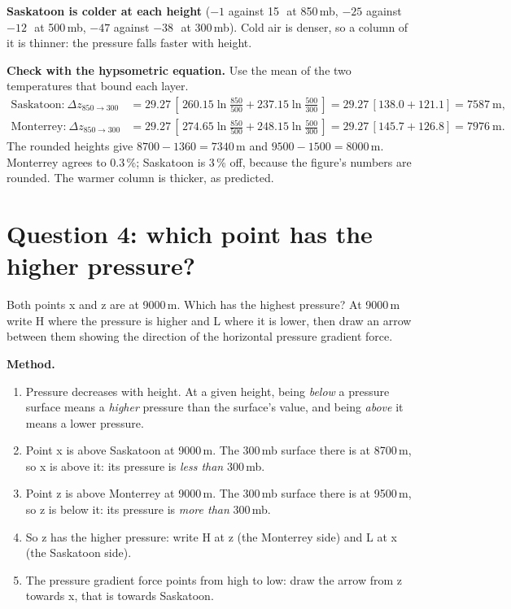 \begin{answerbox}
\textbf{Saskatoon is colder at each height} ($-1$ against 15\,\degC\ at 850\,mb, $-25$ against $-12$\,\degC\ at 500\,mb, $-47$ against $-38$\,\degC\ at 300\,mb). Cold air is denser, so a column of it is thinner: the pressure falls faster with height.
\end{answerbox}

\textbf{Check with the hypsometric equation.} Use the mean of the two temperatures that bound each layer.
\begin{align*}
\text{Saskatoon:}\ \Delta z_{850\to300}&=29.27\,[\,260.15\ln\tfrac{850}{500}+237.15\ln\tfrac{500}{300}\,]=29.27\,[138.0+121.1]=7587\ \mathrm{m},\\
\text{Monterrey:}\ \Delta z_{850\to300}&=29.27\,[\,274.65\ln\tfrac{850}{500}+248.15\ln\tfrac{500}{300}\,]=29.27\,[145.7+126.8]=7976\ \mathrm{m}.
\end{align*}
The rounded heights give $8700-1360=7340$\,m and $9500-1500=8000$\,m. Monterrey agrees to 0.3\,\%; Saskatoon is 3\,\% off, because the figure's numbers are rounded. The warmer column is thicker, as predicted.

\section{Question 4: which point has the higher pressure?}

\begin{questionbox}
Both points x and z are at 9000\,m. Which has the highest pressure? At 9000\,m write H where the pressure is higher and L where it is lower, then draw an arrow between them showing the direction of the horizontal pressure gradient force.
\end{questionbox}

\textbf{Method.}
\begin{enumerate}[label=\textbf{Step \arabic*.},leftmargin=*,itemsep=3pt]
\item Pressure decreases with height. At a given height, being \emph{below} a pressure surface means a \emph{higher} pressure than the surface's value, and being \emph{above} it means a lower pressure.
\item Point x is above Saskatoon at 9000\,m. The 300\,mb surface there is at 8700\,m, so x is above it: its pressure is \emph{less than} 300\,mb.
\item Point z is above Monterrey at 9000\,m. The 300\,mb surface there is at 9500\,m, so z is below it: its pressure is \emph{more than} 300\,mb.
\item So z has the higher pressure: write H at z (the Monterrey side) and L at x (the Saskatoon side).
\item The pressure gradient force points from high to low: draw the arrow from z towards x, that is towards Saskatoon.
\end{enumerate}

